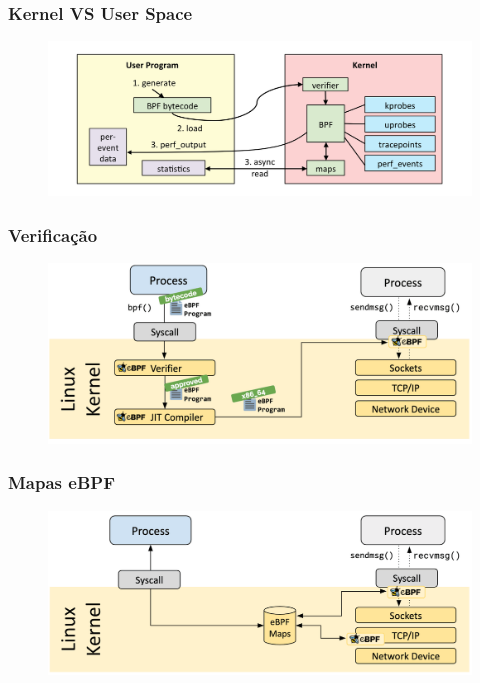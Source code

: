 \documentclass[pdflatex,compress]{beamer}
\begin{document}
\begin{frame}
\frametitle{Kernel VS User Space}


\begin{figure}[x]
\includegraphics[scale=0.21]{internal.png}
\centering
\end{figure}

\end{frame}

%
%
%


\begin{frame}
\frametitle{Verificação}


\begin{figure}[x]
\includegraphics[scale=0.25]{verifier.png}
\centering
\end{figure}

\end{frame}


\begin{frame}
\frametitle{Mapas eBPF}


\begin{figure}[x]
\includegraphics[scale=0.25]{map.png}
\centering
\end{figure}

\end{frame}
\end{document}
